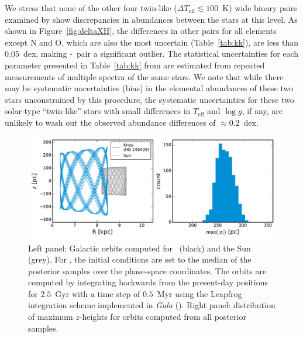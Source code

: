 \documentclass[modern, letterpaper]{aastex61}
\newcommand{\project}[1]{\textsl{#1}}
\newcommand{\figname}{Figure}
\newcommand*\elem[1]{\ensuremath{\mathrm{#1}}}
\newcommand{\sunanalog}{\text{Krios}}
\newcommand{\bizarreone}{\text{Kronos}}
\renewcommand\tablename{Table}
\begin{document}
We stress that none of the other four twin-like ($\Delta T_\mathrm{eff}
\lesssim 100$~K) wide binary pairs examined by \citealt{2016ApJS..225...32B}
show discrepancies in abundances between the stars at this level.
As shown in \figname~\ref{fig:deltaXH},
the differences in other pairs for all elements except \elem{N} and \elem{O},
which are also the most uncertain (\tablename~\ref{tab:kk}),
are less than $0.05$~dex, making \bizarreone-\sunanalog\ pair a significant outlier.
The statistical uncertainties for each parameter
presented in \tablename~\ref{tab:kk} from \citealt{2016ApJS..225...32B}
are estimated from repeated measurements of multiple spectra of the same stars.
We note that while there may be systematic uncertainties (bias) in the elemental
abundances of these two stars unconstrained by this procedure,
the systematic uncertainties for these two solar-type ``twin-like'' stars
with small differences in $T_\mathrm{eff}$ and $\log{g}$, if any, are unlikely to wash out
the observed abundance differences of $\approx 0.2$~dex.

\begin{figure}[htbp]
  \begin{center}
    \includegraphics[width=\linewidth]{orbits.pdf}
  \end{center}
  \caption{Left panel: Galactic orbits computed for \sunanalog\ (black) and the
    Sun (grey).
    For \sunanalog, the initial conditions are set to the median of the
    posterior samples over the phase-space coordinates.
    The orbits are computed by integrating backwards from the present-day
    positions for $2.5$~Gyr with a time step of $0.5$~Myr using the Leapfrog
    integration scheme implemented in \project{Gala} (\citealt{gala}).
    Right panel: distribution of maximum $z$-heights for orbits computed from
    all posterior samples.
  }
  \label{fig:orbit}
\end{figure}
\end{document}

